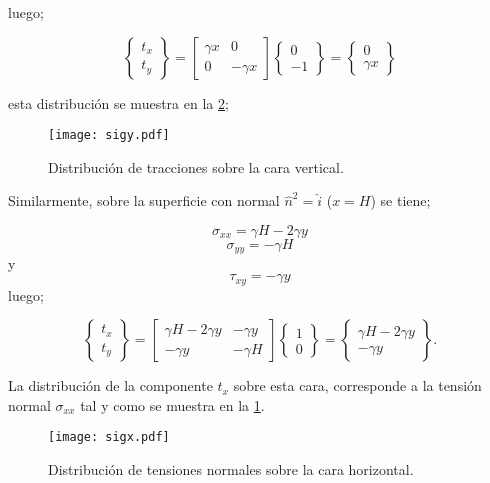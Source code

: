\documentclass[../notas medios.tex]{subfiles}
\begin{document}
luego;

\[\left\{ {\begin{array}{*{20}{c}}
{{t_x}}\\
{{t_y}}
\end{array}} \right\} = \left[ {\begin{array}{*{20}{c}}
{\gamma x}&0\\
0&{ - \gamma x}
\end{array}} \right]\left\{ {\begin{array}{*{20}{c}}
0\\
{ - 1}
\end{array}} \right\} = \left\{ {\begin{array}{*{20}{c}}
0\\
{\gamma x}
\end{array}} \right\}\]

esta distribución se muestra en la \cref{sigy};


\begin{figure}[H]
\centering
	\texttt{[image: sigy.pdf]}
	\caption{Distribución de tracciones sobre la cara vertical.}
	\label{sigx}
\end{figure}


Similarmente, sobre la superficie con normal ${{\hat n}^2} =   \hat i$ ($x=H$) se tiene;

\[{\sigma _{xx}} = \gamma H - 2\gamma y\]
\[{\sigma _{yy}} =  - \gamma H\]
y
\[{\tau _{xy}} =  - \gamma y\]
luego;

\[\left\{ {\begin{array}{*{20}{c}}
{{t_x}}\\
{{t_y}}
\end{array}} \right\} = \left[ {\begin{array}{*{20}{c}}
{\gamma H - 2\gamma y}&{ - \gamma y}\\
{ - \gamma y}&{ - \gamma H}
\end{array}} \right]\left\{ {\begin{array}{*{20}{c}}
1\\
0
\end{array}} \right\} = \left\{ {\begin{array}{*{20}{c}}
{\gamma H - 2\gamma y}\\
{ - \gamma y}
\end{array}} \right\}.\]


La distribución de la componente $t_x$ sobre esta cara, corresponde a la tensión normal $\sigma_{xx}$ tal y como se muestra en la \cref{sigx}. 

\begin{figure}[H]
\centering
	\texttt{[image: sigx.pdf]}
	\caption{Distribución de tensiones normales sobre la cara horizontal.}
	\label{sigy}
\end{figure}
\end{document}
